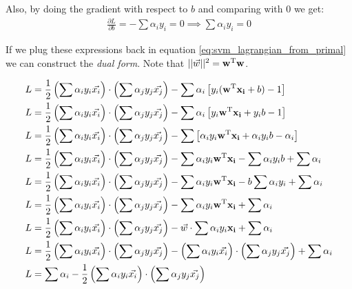 Also, by doing the gradient with respect to $b$ and comparing with 0 we get:
\begin{align}
    \frac{\partial L}{\partial b} = - \sum \alpha_i y_i = 0 \implies \sum \alpha_i y_i = 0
\end{align}
 
If we plug these expressions back in equation \ref{eq:svm_lagrangian_from_primal} we can construct the \emph{dual form}. Note that $     ||\vec{w}||^2 = \mathbf{w}^{\text{T}} \mathbf{w}$.

\begin{align*}
    L &= \frac{1}{2} \left( \sum \alpha_i y_i \vec{x_i} \right) \cdot \left( \sum \alpha_j y_j \vec{x_j} \right)
    - \sum \alpha_i \left[ y_i (\mathbf{w}^{\text{T}} \mathbf{x_i} + b) - 1\right]
\\
    L &= \frac{1}{2} \left( \sum \alpha_i y_i \vec{x_i} \right) \cdot \left( \sum \alpha_j y_j \vec{x_j} \right)
    - \sum \alpha_i \left[ y_i \mathbf{w}^{\text{T}} \mathbf{x_i} + y_i b - 1\right]
\\
    L &= \frac{1}{2} \left( \sum \alpha_i y_i \vec{x_i} \right) \cdot \left( \sum \alpha_j y_j \vec{x_j} \right)
    - \sum \left[ \alpha_i y_i \mathbf{w}^{\text{T}} \mathbf{x_i} + \alpha_i y_i b - \alpha_i \right]
\\
    L &= \frac{1}{2} \left( \sum \alpha_i y_i \vec{x_i} \right) \cdot \left( \sum \alpha_j y_j \vec{x_j} \right)
    - \sum \alpha_i y_i \mathbf{w}^{\text{T}} \mathbf{x_i} - \sum \alpha_i y_i b + \sum \alpha_i
\\
    L &= \frac{1}{2} \left( \sum \alpha_i y_i \vec{x_i} \right) \cdot \left( \sum \alpha_j y_j \vec{x_j} \right)
    - \sum \alpha_i y_i \mathbf{w}^{\text{T}} \mathbf{x_i} - b \sum \alpha_i y_i + \sum \alpha_i 
\\
    L &= \frac{1}{2} \left( \sum \alpha_i y_i \vec{x_i} \right) \cdot \left( \sum \alpha_j y_j \vec{x_j} \right)
    - \sum \alpha_i y_i \mathbf{w}^{\text{T}} \mathbf{x_i} + \sum \alpha_i 
\\
    L &= \frac{1}{2} \left( \sum \alpha_i y_i \vec{x_i} \right) \cdot \left( \sum \alpha_j y_j \vec{x_j} \right)
    - \vec{w} \cdot \sum \alpha_i y_i \mathbf{x_i} + \sum \alpha_i 
\\
    L &= \frac{1}{2} \left( \sum \alpha_i y_i \vec{x_i} \right) \cdot \left( \sum \alpha_j y_j \vec{x_j} \right)
    - \left( \sum \alpha_i y_i \vec{x_i} \right) \cdot \left( \sum \alpha_j y_j \vec{x_j} \right) + \sum \alpha_i 
\\
    L &= \sum \alpha_i - \frac{1}{2} \left( \sum \alpha_i y_i \vec{x_i} \right) \cdot \left( \sum \alpha_j y_j \vec{x_j} \right)
\end{align*}

